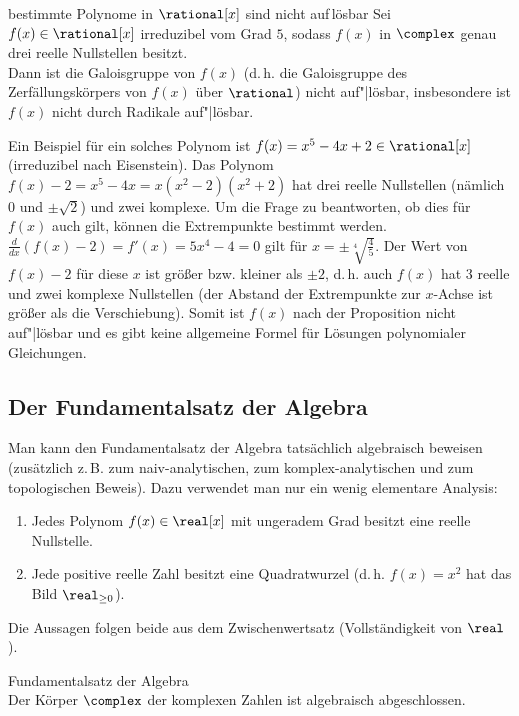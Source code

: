 \linie

\begin{Prop}{bestimmte Polynome in $\rational[x]$ sind nicht auf\,\!lösbar}
    Sei $f(x) \in \rational[x]$ irreduzibel vom Grad $5$, sodass
    $f(x)$ in $\complex$ genau drei reelle Nullstellen besitzt.\\
    Dann ist die Galoisgruppe von $f(x)$
    (d.\,h. die Galoisgruppe des Zerfällungskörpers von $f(x)$ über
    $\rational$)
    nicht auf"|lösbar,
    insbesondere ist $f(x)$ nicht durch Radikale auf"|lösbar.
\end{Prop}

\begin{Bem}
    Ein Beispiel für ein solches Polynom ist
    $f(x) = x^5 - 4x + 2 \in \rational[x]$
    (irreduzibel nach Eisenstein).
    Das Polynom $f(x) - 2 = x^5 - 4x = x(x^2 - 2)(x^2 + 2)$ hat
    drei reelle Nullstellen (nämlich $0$ und $\pm\sqrt{2}$) und
    zwei komplexe.
    Um die Frage zu beantworten, ob dies für $f(x)$ auch gilt, können die
    Extrempunkte bestimmt werden.
    $\frac{d}{dx}(f(x) - 2) = f'(x) = 5x^4 - 4 = 0$ gilt für
    $x = \pm\sqrt[4]{\frac{4}{5}}$.
    Der Wert von $f(x) - 2$ für diese $x$ ist größer bzw. kleiner als
    $\pm 2$,
    d.\,h. auch $f(x)$ hat $3$ reelle und zwei komplexe Nullstellen
    (der Abstand der Extrempunkte zur $x$-Achse ist größer als die
    Verschiebung).
    Somit ist $f(x)$ nach der Proposition nicht auf"|lösbar und
    es gibt keine allgemeine Formel für Lösungen polynomialer Gleichungen.
\end{Bem}

\subsection{%
    Der Fundamentalsatz der Algebra%
}

\begin{Bem}
    Man kann den Fundamentalsatz der Algebra tatsächlich algebraisch beweisen
    (zusätzlich z.\,B. zum naiv-analytischen, zum
    komplex-analytischen und zum topologischen Beweis).
    Dazu verwendet man nur ein wenig elementare Analysis:
    \begin{enumerate}[label=(\alph*)]
        \item
        Jedes Polynom $f(x) \in \real[x]$ mit ungeradem Grad besitzt
        eine reelle Nullstelle.

        \item
        Jede positive reelle Zahl besitzt eine Quadratwurzel
        (d.\,h. $f(x) = x^2$ hat das Bild $\real_{\ge 0}$).
    \end{enumerate}
    Die Aussagen folgen beide aus dem Zwischenwertsatz
    (Vollständigkeit von $\real$).
\end{Bem}

\begin{Theorem}{Fundamentalsatz der Algebra}\\
    Der Körper $\complex$ der komplexen Zahlen ist algebraisch abgeschlossen.
\end{Theorem}

\pagebreak
